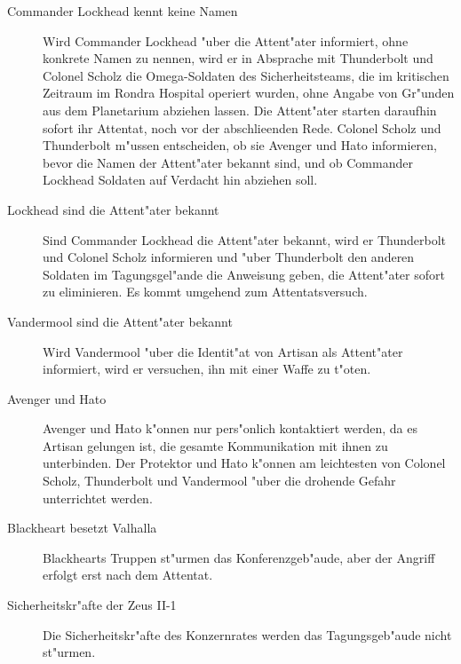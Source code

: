 \begin{description}
	\item[Commander Lockhead kennt keine Namen] Wird Commander Lockhead "uber die Attent"ater informiert, ohne konkrete Namen zu nennen, 	
		wird er in Absprache mit Thunderbolt und Colonel Scholz die Omega-Soldaten des Sicherheitsteams, die im kritischen Zeitraum im Rondra Hospital operiert wurden, ohne Angabe von Gr"unden aus dem Planetarium abziehen lassen. Die Attent"ater starten daraufhin sofort ihr Attentat, noch vor der abschlie\3enden Rede. Colonel Scholz und Thunderbolt m"ussen entscheiden, ob sie Avenger und Hato informieren, bevor die Namen der Attent"ater bekannt sind, und ob Commander Lockhead Soldaten auf Verdacht hin abziehen soll.
	\item[Lockhead sind die Attent"ater bekannt] Sind Commander Lockhead die Attent"ater bekannt, wird er Thunderbolt und Colonel Scholz 
		informieren und "uber Thunderbolt den anderen Soldaten im Tagungsgel"ande die Anweisung geben, die Attent"ater sofort zu eliminieren. Es kommt umgehend zum Attentatsversuch. 
	\item[Vandermool sind die Attent"ater bekannt] Wird Vandermool "uber die Identit"at von Artisan als Attent"ater informiert, wird er 
		versuchen, ihn mit einer Waffe zu t"oten. 
	\item[Avenger und Hato] Avenger und Hato k"onnen nur pers"onlich kontaktiert werden, da es Artisan gelungen ist, die gesamte 
		Kommunikation mit ihnen zu unterbinden. Der Protektor und Hato k"onnen am leichtesten von Colonel Scholz, Thunderbolt und Vandermool "uber die drohende Gefahr unterrichtet werden.
	\item[Blackheart besetzt Valhalla] Blackhearts Truppen st"urmen das Konferenzgeb"aude, aber der Angriff erfolgt erst nach dem Attentat.
	\item[Sicherheitskr"afte der Zeus II-1] Die Sicherheitskr"afte des Konzernrates werden das Tagungsgeb"aude nicht st"urmen.
\end{description}


